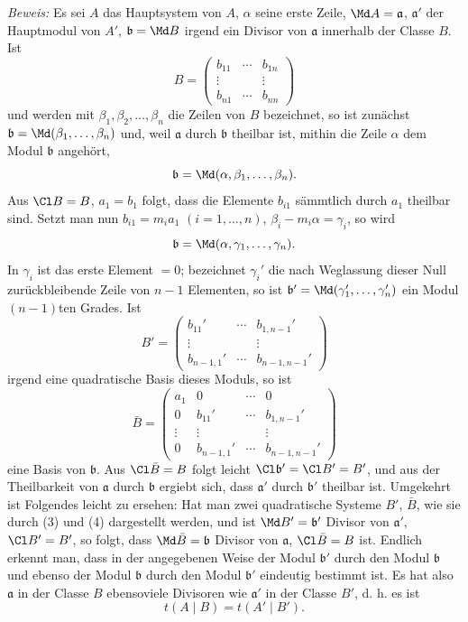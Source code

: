 \emph{Beweis:} Es sei $A$ das Hauptsystem von $A$, $\alpha$ seine erste Zeile, $\Md A=\mathfrak a$, $\mathfrak a'$ der Hauptmodul von $A'$, $\mathfrak b=\Md B$ irgend ein Divisor von $\mathfrak a$ innerhalb der Classe $B$. Ist
\[
 B=\begin{pmatrix}
 b_{11}&\cdots&b_{1n}\\
 \vdots&&\vdots\\
 b_{n1}&\cdots&b_{nn}
 \end{pmatrix}
\]
und werden mit $\beta_1,\beta_2,\ldots,\beta_n$ die Zeilen von $B$ bezeichnet, so ist zunächst $\mathfrak b=\Md(\beta_1,\ldots,\beta_n)$ und, weil $\mathfrak a$ durch $\mathfrak b$ theilbar ist, mithin die Zeile $\alpha$ dem Modul $\mathfrak b$ angehört,
\[
 \mathfrak b=\Md(\alpha,\beta_1,\ldots,\beta_n).
\]
Aus $\Cl B=B$, $a_1=b_1$ folgt, dass die Elemente $b_{i1}$ sämmtlich durch $a_1$ theilbar sind. Setzt man nun $b_{i1}=m_i a_1$ $(i=1,\ldots,n)$, $\beta_i-m_i\alpha=\gamma_i$, so wird
\[
 \mathfrak b=\Md(\alpha,\gamma_1,\ldots,\gamma_n).
\]
In $\gamma_i$ ist das erste Element $=0$; bezeichnet $\gamma_i'$ die nach Weglassung dieser Null zurückbleibende Zeile von $n-1$ Elementen, so ist $\mathfrak b'=\Md(\gamma_1',\ldots,\gamma_n')$ ein Modul $(n-1)$ten Grades. Ist
\begin{equation}
 B'=\begin{pmatrix}
 b_{11}'&\cdots&b_{1,n-1}'\\
 \vdots&&\vdots\\
 b_{n-1,1}'&\cdots&b_{n-1,n-1}'
 \end{pmatrix}
\tag{3}
\end{equation}
irgend eine quadratische Basis dieses Moduls, so ist
\begin{equation}
 \bar B=\begin{pmatrix}
 a_1&0&\cdots&0\\
 0&b_{11}'&\cdots&b_{1,n-1}'\\
 \vdots&\vdots&&\vdots\\
 0&b_{n-1,1}'&\cdots&b_{n-1,n-1}'
 \end{pmatrix}
\tag{4}
\end{equation}
eine Basis von $\mathfrak b$. Aus $\Cl\bar B=B$ folgt leicht $\Cl\mathfrak b'=\Cl B'=B'$, und aus der Theilbarkeit von $\mathfrak a$ durch $\mathfrak b$ ergiebt sich, dass $\mathfrak a'$ durch $\mathfrak b'$ theilbar ist. Umgekehrt ist Folgendes leicht zu ersehen: Hat man zwei quadratische Systeme $B'$, $\bar B$, wie sie durch (3) und (4) dargestellt werden, und ist $\Md B'=\mathfrak b'$ Divisor von $\mathfrak a'$, $\Cl B'=B'$, so folgt, dass $\Md\bar B=\mathfrak b$ Divisor von $\mathfrak a$, $\Cl\bar B=B$ ist. Endlich erkennt man, dass in der angegebenen Weise der Modul $\mathfrak b'$ durch den Modul $\mathfrak b$ und ebenso der Modul $\mathfrak b$ durch den Modul $\mathfrak b'$ eindeutig bestimmt ist. Es hat also $\mathfrak a$ in der Classe $B$ ebensoviele Divisoren wie $\mathfrak a'$ in der Classe $B'$, d. h. es ist
\[
 t(A\mid B)=t(A'\mid B').
\]


